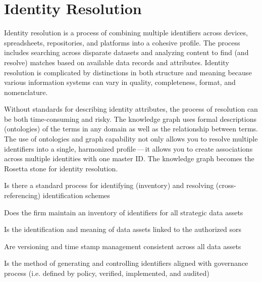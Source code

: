 \section{Identity Resolution}\label{sec:ekgmm-b-2-1} %

Identity resolution is a process of combining multiple identifiers across devices, spreadsheets, repositories, and
platforms into a cohesive profile.
The process includes searching across disparate datasets and analyzing content to find (and resolve) matches based
on available data records and attributes.
Identity resolution is complicated by distinctions in both structure and meaning because various information systems
can vary in quality, completeness, format, and nomenclature.

\ekgmmContextSection

Without standards for describing identity attributes, the process of resolution can be both time-consuming and risky.
The knowledge graph uses formal descriptions (ontologies) of the terms in any domain as well as the relationship
between terms.
The use of ontologies and graph capability not only allows you to resolve multiple identifiers into a single,
harmonized profile\,---\,it allows you to create associations across multiple identities with one master ID.
The knowledge graph becomes the Rosetta stone for identity resolution.

\kgmmcorequestionssection

\begin{core-questions}

  \item [\thesection.1] Is there a standard process for identifying (inventory) and resolving (cross-referencing)
                        identification schemes
  \item [\thesection.2] Does the firm maintain an inventory of identifiers for all strategic data assets
  \item [\thesection.3] Is the identification and meaning of data assets linked to the authorized \glspl{sor}
  \item [\thesection.4] Are versioning and time stamp management consistent across all data assets
  \item [\thesection.5] Is the method of generating and controlling identifiers aligned with governance process
                        (i.e. defined by policy, verified, implemented, and audited)

\end{core-questions}

